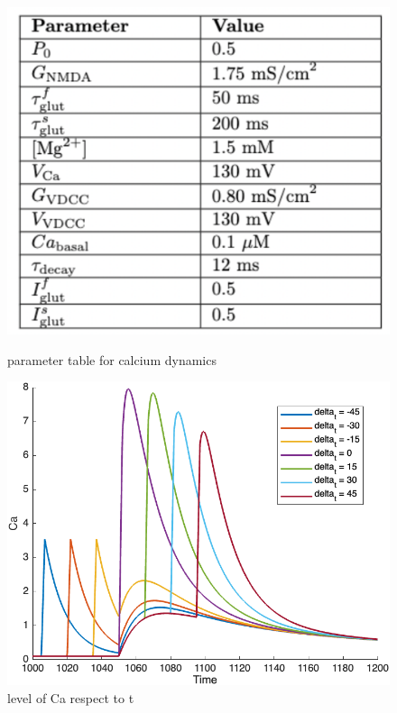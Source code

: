 \documentclass{article}
\begin{document}
\begin{figure}[h]
    \begin{minipage}{.45\linewidth}
        \centering
        \includegraphics[width=.95\linewidth]{parameter_table.png}
        \caption{parameter table for calcium dynamics}
        \label{fig:fig4}
    \end{minipage}
    \hfill
    \begin{minipage}{.45\linewidth}
        \centering
        \includegraphics[width=.95\linewidth]{Ca.png}
        \caption{level of Ca respect to t}
        \label{fig:fig5}
    \end{minipage}
\end{figure}
\end{document}
